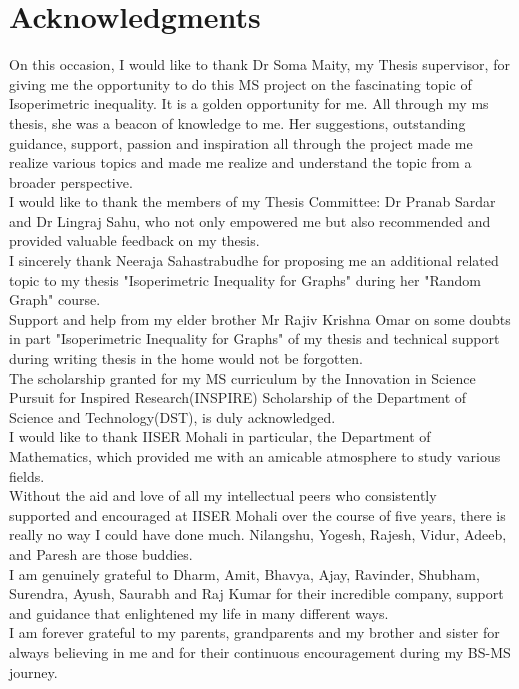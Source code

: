 \documentclass[oneside]{book}
\begin{document}
	\chapter*{Acknowledgments}
	On this occasion, I would like to thank Dr Soma Maity, my Thesis supervisor, for giving me the opportunity to do this MS project on the fascinating topic of Isoperimetric inequality. It is a golden opportunity for me. All through my ms thesis, she was a beacon of knowledge to me. 
	Her suggestions, outstanding guidance, support, passion and inspiration all through the project made me realize various topics and made me realize and understand the topic from a broader perspective. \\ 
	I would like to thank the members of my Thesis Committee: Dr Pranab Sardar and Dr Lingraj Sahu, who not only empowered me but also recommended and provided valuable feedback on my thesis. \\
	I sincerely thank Neeraja Sahastrabudhe for proposing me an additional related topic to my thesis "Isoperimetric Inequality for Graphs"  during her "Random Graph" course. \\
	Support and help from my elder brother Mr Rajiv Krishna Omar on some doubts in part "Isoperimetric Inequality for Graphs" of my thesis and technical support during writing thesis in the home would not be forgotten.\\
	The scholarship granted for my MS curriculum by the Innovation in Science Pursuit for Inspired Research(INSPIRE) Scholarship of the Department of Science and Technology(DST), is duly acknowledged.\\
	I would like to thank IISER Mohali in particular, the Department of Mathematics, which provided me with an amicable atmosphere to study various fields. \\
	Without the aid and love of all my intellectual peers who consistently \\supported and encouraged at IISER Mohali over the course of five years, there is really no way I could have done much. Nilangshu, Yogesh, Rajesh, Vidur, Adeeb, and Paresh are those buddies. 
	\\
	I am genuinely grateful to Dharm, Amit, Bhavya, Ajay, Ravinder, Shubham, Surendra, Ayush, Saurabh and Raj Kumar for their incredible company,
	support and guidance that enlightened my life in many different ways.\\
	I am forever grateful to my parents, grandparents and my brother and sister for always believing in me and for their continuous encouragement during my BS-MS journey.
	\thispagestyle{empty}
	
\end{document}
